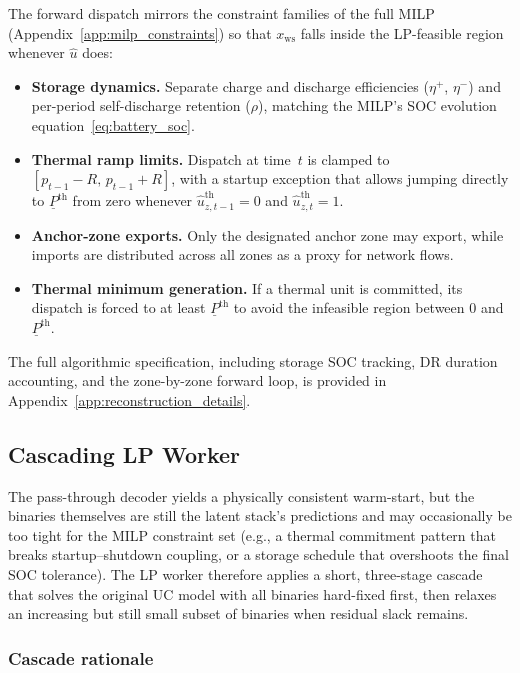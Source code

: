 \documentclass{article}
\begin{document}
The forward dispatch mirrors the constraint families of the full MILP (Appendix~\ref{app:milp_constraints}) so that $x_{\mathrm{ws}}$ falls inside the LP-feasible region whenever $\hat{u}$ does:

\begin{itemize}[noitemsep]
  \item \textbf{Storage dynamics.} Separate charge and discharge efficiencies ($\eta^+$, $\eta^-$) and per-period self-discharge retention ($\rho$), matching the MILP's SOC evolution equation~\eqref{eq:battery_soc}.
  \item \textbf{Thermal ramp limits.} Dispatch at time~$t$ is clamped to $[p_{t-1} - R, \, p_{t-1} + R]$, with a startup exception that allows jumping directly to $\underline{P}^{\mathrm{th}}$ from zero whenever $\hat{u}^{\mathrm{th}}_{z,t-1} = 0$ and $\hat{u}^{\mathrm{th}}_{z,t} = 1$.
  \item \textbf{Anchor-zone exports.} Only the designated anchor zone may export, while imports are distributed across all zones as a proxy for network flows.
  \item \textbf{Thermal minimum generation.} If a thermal unit is committed, its dispatch is forced to at least $\underline{P}^{\mathrm{th}}$ to avoid the infeasible region between 0 and $\underline{P}^{\mathrm{th}}$.
\end{itemize}

The full algorithmic specification, including storage SOC tracking, DR duration accounting, and the zone-by-zone forward loop, is provided in Appendix~\ref{app:reconstruction_details}.


\subsection{Cascading LP Worker}
\label{sec:lp_worker}

The pass-through decoder yields a physically consistent warm-start, but the binaries themselves are still the latent stack's predictions and may occasionally be too tight for the MILP constraint set (e.g., a thermal commitment pattern that breaks startup--shutdown coupling, or a storage schedule that overshoots the final SOC tolerance). The LP worker therefore applies a short, three-stage cascade that solves the original UC model with all binaries hard-fixed first, then relaxes an increasing but still small subset of binaries when residual slack remains.

\subsubsection{Cascade rationale}
\end{document}
